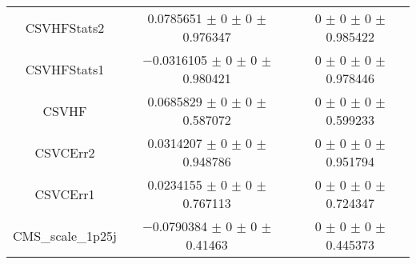 \begin{table}
\begin{tabular}{ccc}
CSVHFStats2 	& \num{0.0785651} $\pm$ \num{0} $\pm$ \num{0} $\pm$ \num{0.976347} 	& \num{0} $\pm$ \num{0} $\pm$ \num{0} $\pm$ \num{0.985422}\\
CSVHFStats1 	& \num{-0.0316105} $\pm$ \num{0} $\pm$ \num{0} $\pm$ \num{0.980421} 	& \num{0} $\pm$ \num{0} $\pm$ \num{0} $\pm$ \num{0.978446}\\
CSVHF 	& \num{0.0685829} $\pm$ \num{0} $\pm$ \num{0} $\pm$ \num{0.587072} 	& \num{0} $\pm$ \num{0} $\pm$ \num{0} $\pm$ \num{0.599233}\\
CSVCErr2 	& \num{0.0314207} $\pm$ \num{0} $\pm$ \num{0} $\pm$ \num{0.948786} 	& \num{0} $\pm$ \num{0} $\pm$ \num{0} $\pm$ \num{0.951794}\\
CSVCErr1 	& \num{0.0234155} $\pm$ \num{0} $\pm$ \num{0} $\pm$ \num{0.767113} 	& \num{0} $\pm$ \num{0} $\pm$ \num{0} $\pm$ \num{0.724347}\\
CMS\_scale\_1p25j 	& \num{-0.0790384} $\pm$ \num{0} $\pm$ \num{0} $\pm$ \num{0.41463} 	& \num{0} $\pm$ \num{0} $\pm$ \num{0} $\pm$ \num{0.445373}\\
\bottomrule
\end{tabular}
\end{table}
